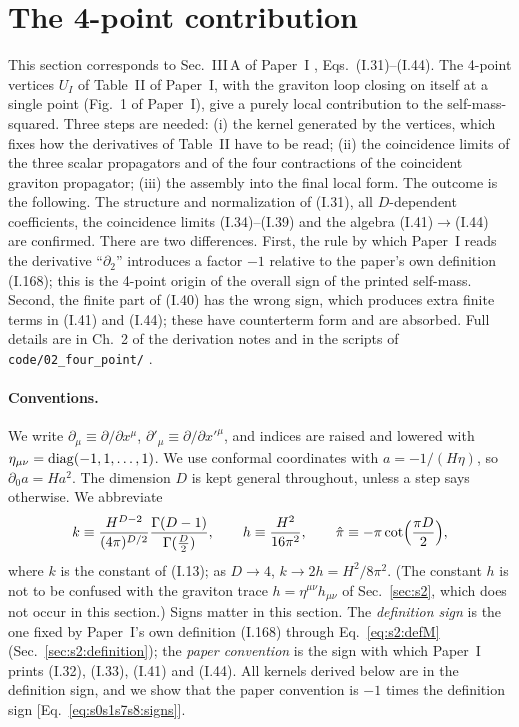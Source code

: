 \documentclass[aps,prd,onecolumn,10pt,nofootinbib,floatfix]{revtex4-2}
\newcommand{\PI}{Paper~I}
\newcommand{\eqI}[1]{(I.#1)}
\newcommand{\pihat}{\hat\pi}
\begin{document}
\section{The 4-point contribution}
\label{sec:s3}

This section corresponds to Sec.~III\,A of \PI{} \cite{KW07}, Eqs.~\eqI{31}--\eqI{44}.
The 4-point vertices $U_I$ of Table~II of \PI{}, with the graviton loop closing on itself
at a single point (Fig.~1 of \PI), give a purely local contribution to the self-mass-squared.
Three steps are needed: (i) the kernel generated by the vertices, which fixes how the
derivatives of Table~II have to be read; (ii) the coincidence limits of the three scalar
propagators and of the four contractions of the coincident graviton propagator; (iii) the
assembly into the final local form. The outcome is the following. The structure and
normalization of \eqI{31}, all $D$-dependent coefficients, the coincidence limits
\eqI{34}--\eqI{39} and the algebra \eqI{41}$\to$\eqI{44} are confirmed. There are two
differences. First, the rule by which \PI{} reads the derivative ``$\partial_2$'' introduces a
factor $-1$ relative to the paper's own definition \eqI{168}; this is the 4-point origin of the
overall sign of the printed self-mass. Second, the finite part of \eqI{40} has the wrong sign,
which produces extra finite terms in \eqI{41} and \eqI{44}; these have counterterm form and are
absorbed. Full details are in Ch.~2 of the derivation notes and in the scripts of
\nolinkurl{code/02_four_point/} \cite{ref:repo}.

\paragraph*{Conventions.}
We write $\partial_\mu\equiv\partial/\partial x^\mu$, $\partial'_\mu\equiv\partial/\partial x'^\mu$, and indices
are raised and lowered with $\eta_{\mu\nu}={\rm diag}(-1,1,\dots,1)$. We use conformal
coordinates with $a=-1/(H\eta)$, so $\partial_0a=Ha^2$. The dimension $D$ is kept general
throughout, unless a step says otherwise. We abbreviate
\begin{equation}\label{eq:s3:abbrev}
k\equiv\frac{H^{D-2}}{(4\pi)^{D/2}}\frac{\Gamma(D-1)}{\Gamma(\frac D2)},\qquad
h\equiv\frac{H^2}{16\pi^2},\qquad
\pihat\equiv-\pi\cot\Bigl(\frac{\pi D}{2}\Bigr),
\end{equation}
where $k$ is the constant of \eqI{13}; as $D\to4$, $k\to2h=H^2/8\pi^2$. (The constant $h$ is not to be confused with the graviton
trace $h=\eta^{\mu\nu}h_{\mu\nu}$ of Sec.~\ref{sec:s2}, which does not occur in this section.)
Signs matter in this section. The \emph{definition sign} is the one fixed by \PI's own
definition \eqI{168} through Eq.~\eqref{eq:s2:defM} (Sec.~\ref{sec:s2:definition}); the \emph{paper
convention} is the sign with which \PI{} prints \eqI{32}, \eqI{33}, \eqI{41} and \eqI{44}. All kernels
derived below are in the definition sign, and we show that the paper convention is $-1$ times the
definition sign [Eq.~\eqref{eq:s0s1s7s8:signs}].
\end{document}
